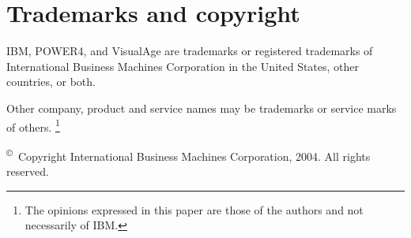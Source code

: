 
\section{Trademarks and copyright}

IBM, POWER4, and VisualAge are trademarks or registered
trademarks of International Business Machines Corporation in the
United States, other countries, or both.

\noindent Other company, product and service names may be trademarks or service
marks of others. \footnote{The opinions expressed in this paper are
  those of the authors and not necessarily of IBM.}
  

\noindent \textsuperscript \copyright\ Copyright International Business Machines Corporation, 2004. All rights reserved.


